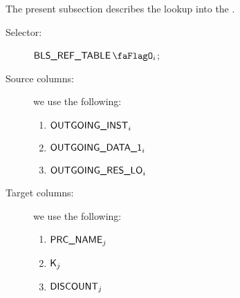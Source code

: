 The present subsection describes the lookup into the \blsRefTable{}.
\begin{description}
	\item[Selector:] $\blsRefTableFlag{}_{i}$;
	\item[Source columns:] we use the following:
		\begin{multicols}{2}
			\begin{enumerate}
				\item $\textsf{OUTGOING\_INST}_{i}$
				\item $\textsf{OUTGOING\_DATA\_1}_{i}$
				\item $\textsf{OUTGOING\_RES\_LO}_{i}$
			\end{enumerate}
		\end{multicols}
	\item[Target columns:] we use the following:
		\begin{multicols}{2}
			\begin{enumerate}
				\item $\textsf{PRC\_NAME}_{j}$
				\item $\textsf{K}_{j}$
				\item $\textsf{DISCOUNT}_{j}$
			\end{enumerate}
		\end{multicols}
\end{description}
